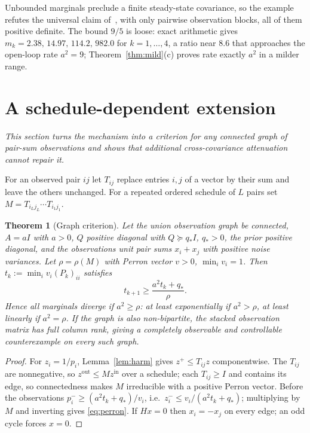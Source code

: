 \documentclass[11pt,a4paper]{article}
\numberwithin{equation}{section}
\newtheorem{theorem}{Theorem}[section]
\theoremstyle{remark}\newtheorem{remark}[theorem]{Remark}
\begin{document}
Unbounded marginals preclude a finite steady-state covariance, so the example refutes the
universal claim of~\citep[Conjecture~1]{JungLuftWeiss2025}, with only pairwise observation
blocks, all of them positive definite. The bound $9/5$ is loose: exact arithmetic gives
$m_k=2.38,\,14.97,\,114.2,\,982.0$ for $k=1,\dots,4$, a ratio near $8.6$ that approaches the
open-loop rate $a^2=9$; Theorem~\ref{thm:mild}(c) proves rate exactly $a^2$ in a milder range.

\section{A schedule-dependent extension}\label{sec:graph}

\emph{This section turns the mechanism into a criterion for any connected graph of pair-sum
observations and shows that additional cross-covariance attenuation cannot repair it.}

For an observed pair $ij$ let $T_{ij}$ replace entries $i,j$ of a vector by their sum and leave
the others unchanged. For a repeated ordered schedule of $L$ pairs set
$M=T_{i_Lj_L}\cdots T_{i_1j_1}$.

\begin{theorem}[Graph criterion]\label{thm:graph}
Let the union observation graph be connected, $A=aI$ with $a>0$, $Q$ positive diagonal with
$Q\succeq q_*I$, $q_*>0$, the prior positive diagonal, and the observations unit pair sums
$x_i+x_j$ with positive noise variances. Let $\rho=\rho(M)$ with Perron vector $v>0$,
$\min_iv_i=1$. Then $t_k:=\min_iv_i(P_k)_{ii}$ satisfies
\begin{equation}\label{eq:perron}
t_{k+1}\ge\frac{a^2t_k+q_*}{\rho}.
\end{equation}
Hence all marginals diverge if $a^2\ge\rho$: at least exponentially if $a^2>\rho$, at least
linearly if $a^2=\rho$. If the graph is also non-bipartite, the stacked observation matrix has
full column rank, giving a completely observable and controllable counterexample on every such
graph.
\end{theorem}

\begin{proof}
For $z_i=1/p_i$, Lemma~\ref{lem:harm} gives $z^+\le T_{ij}z$ componentwise. The $T_{ij}$ are
nonnegative, so $z^{\mathrm{out}}\le Mz^{\mathrm{in}}$ over a schedule; each $T_{ij}\ge I$ and
contains its edge, so connectedness makes $M$ irreducible with a positive Perron vector. Before
the observations $p_i^-\ge(a^2t_k+q_*)/v_i$, i.e.\ $z_i^-\le v_i/(a^2t_k+q_*)$; multiplying by
$M$ and inverting gives \eqref{eq:perron}. If $Hx=0$ then $x_i=-x_j$ on every edge; an odd
cycle forces $x=0$.
\end{proof}
\end{document}
